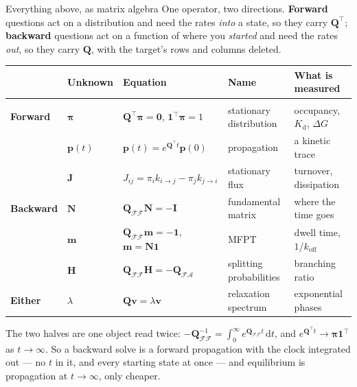 \documentclass[10pt,aspectratio=169]{beamer}
\newcommand{\Q}{\bm{Q}}
\newcommand{\koff}{k_{\mathrm{off}}}
\begin{document}
\begin{frame}{Everything above, as matrix algebra}
  \small
  One operator, two directions. \textbf{Forward} questions act on a
  distribution and need the rates \emph{into} a state, so they carry
  $\Q^{\!\top}$; \textbf{backward} questions act on a function of where you
  \emph{started} and need the rates \emph{out}, so they carry $\Q$, with the
  target's rows and columns deleted.

  \vspace{0.1em}
  {\renewcommand{\arraystretch}{1.15}
  \begin{tabular}{@{}lllll@{}}
    & \textbf{Unknown} & \textbf{Equation} & \textbf{Name}
      & \textbf{What is measured}\\[2pt]
    \hline\\[-6pt]
    \textbf{Forward}
      & $\bm{\pi}$ & $\Q^{\!\top}\bm{\pi}=\bm{0}$,\;
        $\bm{1}^{\!\top}\bm{\pi}=1$ & stationary distribution
        & occupancy, $K_{\mathrm{d}}$, $\Delta G$\\
      & $\bm{p}(t)$ & $\bm{p}(t)=e^{\Q^{\!\top}t}\bm{p}(0)$ & propagation
        & a kinetic trace\\
      & $\bm{J}$ & $J_{ij}=\pi_i k_{i\to j}-\pi_j k_{j\to i}$
        & stationary flux & turnover, dissipation\\[3pt]
    \textbf{Backward}
      & $\bm{N}$ & $\Q_{\mathcal{F}\mathcal{F}}\bm{N}=-\bm{I}$
        & fundamental matrix & where the time goes\\
      & $\bm{m}$ & $\Q_{\mathcal{F}\mathcal{F}}\bm{m}=-\bm{1}$,\;
        $\bm{m}=\bm{N}\bm{1}$ & MFPT
        & dwell time, $1/\koff$\\
      & $\bm{H}$ & $\Q_{\mathcal{F}\mathcal{F}}\bm{H}
        =-\Q_{\mathcal{F}\mathcal{A}}$ & splitting probabilities
        & branching ratio\\[3pt]
    \textbf{Either} & $\lambda$ & $\Q\bm{v}=\lambda\bm{v}$
      & relaxation spectrum & exponential phases\\
  \end{tabular}}

  \vspace{0.4em}
  The two halves are one object read twice:
  $-\Q_{\mathcal{F}\mathcal{F}}^{-1}
    = \int_0^\infty e^{\Q_{\mathcal{F}\mathcal{F}}t}\,\mathrm{d}t$, and
  $e^{\Q^{\!\top}t}\to\bm{\pi}\bm{1}^{\!\top}$ as $t\to\infty$. So a
  backward solve is a forward propagation with the clock integrated out ---
  no $t$ in it, and every starting state at once --- and equilibrium is
  propagation at $t\to\infty$, only cheaper.
\end{frame}
\end{document}
